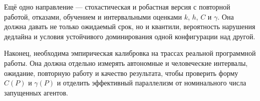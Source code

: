 Ещё одно направление --- стохастическая и робастная версия с повторной работой, отказами,
обучением и интервальными оценками $k$, $h$, $C$ и $\gamma$. Она должна давать не только
ожидаемый срок, но и квантили, вероятность нарушения дедлайна и условия устойчивого
доминирования одной конфигурации над другой.

Наконец, необходима эмпирическая калибровка на трассах реальной программной работы. Она
должна отдельно измерять автономные и человеческие интервалы, ожидание, повторную работу и
качество результата, чтобы проверить форму $C(P)$ и $\gamma(P)$ и отделить эффективный
параллелизм от номинального числа запущенных агентов.
